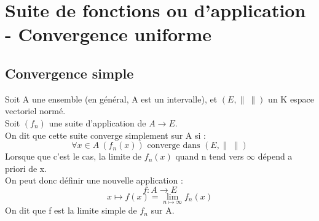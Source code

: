 \chapter{Suite de fonctions ou d'application - Convergence uniforme}
\section{Convergence simple}
\begin{de}
Soit A une ensemble (en général, A est un intervalle), et $(E,\parallel~\parallel)$ un K espace vectoriel normé.\\
Soit $(f_n)$ une suite d'application de $A\rightarrow E$.\\
On dit que cette suite converge simplement sur A si : 
$$\forall x \in A~ (f_n(x)) \mbox{ converge dans } (E,\parallel~\parallel)$$
Lorsque que c'est le cas, la limite de $f_n(x)$ quand n tend vers $\infty$ dépend a priori de x.\\
On peut donc définir une nouvelle application : 
$$f : A \rightarrow E$$
$$x \mapsto f(x) = \lim_{n\mapsto\infty}f_n(x)$$
On dit que f est la limite simple de $f_n$ sur A.
\end{de}
